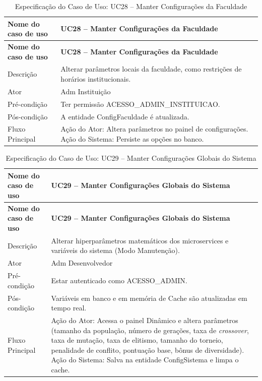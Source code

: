 \fonteautores

\vspace{\baselineskip}

\Needspace{0.48\textheight}
\begin{longtable}{|L{4.5cm}|L{10.5cm}|}
\caption{Especificação do Caso de Uso: UC28 -- Manter Configurações da Faculdade} \\
\hline
\textbf{Nome do caso de uso} & \textbf{UC28 -- Manter Configurações da Faculdade} \\
\hline
\endfirsthead
\hline
\textbf{Nome do caso de uso} & \textbf{UC28 -- Manter Configurações da Faculdade} \\
\hline
\endhead
Descrição       & Alterar parâmetros locais da faculdade, como restrições de horários institucionais. \\
\hline
Ator            & Adm Instituição \\
\hline
Pré-condição    & Ter permissão ACESSO\_ADMIN\_INSTITUICAO. \\
\hline
Pós-condição    & A entidade ConfigFaculdade é atualizada. \\
\hline
Fluxo Principal & Ação do Ator: Altera parâmetros no painel de configurações. Ação do Sistema: Persiste as opções no banco. \\
\hline
\end{longtable}

\fonteautores

\vspace{\baselineskip}

\Needspace{0.48\textheight}
\begin{longtable}{|L{4.5cm}|L{10.5cm}|}
\caption{Especificação do Caso de Uso: UC29 -- Manter Configurações Globais do Sistema} \\
\hline
\textbf{Nome do caso de uso} & \textbf{UC29 -- Manter Configurações Globais do Sistema} \\
\hline
\endfirsthead
\hline
\textbf{Nome do caso de uso} & \textbf{UC29 -- Manter Configurações Globais do Sistema} \\
\hline
\endhead
Descrição       & Alterar hiperparâmetros matemáticos dos microservices e variáveis do sistema (Modo Manutenção). \\
\hline
Ator            & Adm Desenvolvedor \\
\hline
Pré-condição    & Estar autenticado como ACESSO\_ADMIN. \\
\hline
Pós-condição    & Variáveis em banco e em memória de Cache são atualizadas em tempo real. \\
\hline
Fluxo Principal & Ação do Ator: Acessa o painel Dinâmico e altera parâmetros (tamanho da população, número de gerações, taxa de \textit{crossover}, taxa de mutação, taxa de elitismo, tamanho do torneio, penalidade de conflito, pontuação base, bônus de diversidade). Ação do Sistema: Salva na entidade ConfigSistema e limpa o cache. \\
\hline
\end{longtable}

